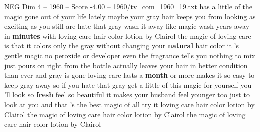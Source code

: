 \begin{textsample}{NEG Dim 4 – 1960 – Score -4.00 – 1960/tv\_com\_1960\_19.txt}  \label{ex:f4_neg_081}
has a little of the magic gone out of your life lately maybe your gray hair keeps you from looking as exciting as you still are hate that gray wash it away like magic wash years away in \textbf{minutes} with loving care hair color lotion by Clairol the magic of loving care is that it colors only the gray without changing your \textbf{natural} hair color it 's gentle magic no peroxide or developer even the fragrance tells you nothing to mix just pours on right from the bottle actually leaves your hair in better condition than ever and gray is gone loving care lasts a \textbf{month} or more makes it so easy to keep gray away so if you hate that gray get a little of this magic for yourself you 'll look so \textbf{fresh} feel so beautiful it makes your husband feel younger too just to look at you and that 's the best magic of all try it loving care hair color lotion by Clairol the magic of loving care hair color lotion by Clairol the magic of loving care hair color lotion by Clairol

\end{textsample}
